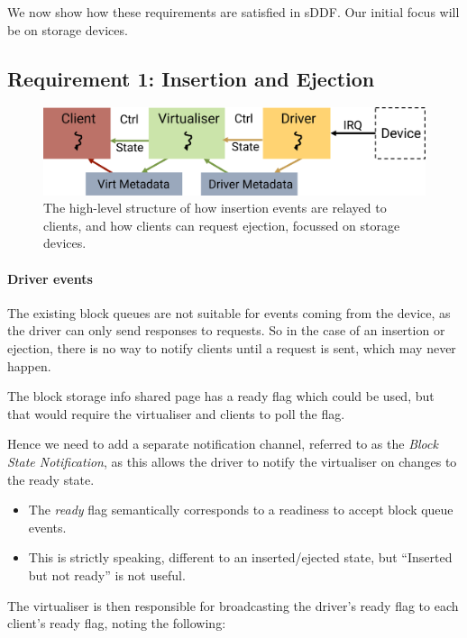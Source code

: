 \documentclass[a4paper,12pt]{report}
\newcommand{\figscale}{0.2}
\begin{document}
We now show how these requirements are satisfied in sDDF. Our initial
focus will be on storage devices.

\subsection{Requirement 1: Insertion and Ejection}


\begin{figure}[th]
  \centering
  \includegraphics[scale=\figscale]{hotplug_insert_eject}
  \caption{The high-level structure of how insertion events are relayed to clients,
           and how clients can request ejection, focussed on storage devices.}
  \label{f:hotplug_insert_and_ejection}
\end{figure}

\paragraph{Driver events}

The existing block queues are not suitable for events coming from the device, as the driver can
only send responses to requests. So in the case of an insertion or
ejection, there is no way to notify clients until a request is sent,
which may never happen.

The block storage info shared page has a ready flag which could be
used, but that would require the virtualiser and clients to poll the flag.

Hence we need to add a separate notification channel, referred to as the
\emph{Block State Notification}, as this allows the driver to notify
the virtualiser on changes to the ready state.

\begin{itemize}
\item The \emph{ready} flag semantically corresponds to a readiness to
  accept block queue events.

\item This is strictly speaking, different to an inserted/ejected state,
  but ``Inserted but not ready'' is not useful.
\end{itemize}

The virtualiser is then responsible for broadcasting the driver's ready
flag to each client's ready flag, noting the following:
\end{document}
